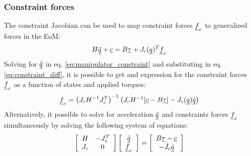 \subsubsection{Constraint forces}
\label{sec:constraint_forces}

The constraint Jacobian can be used to map constraint forces $\underline{f}_c$ to generalized forces in the EoM:
%
\begin{align}
H \underline{\ddot{q}} + \underline{c} = B \underline{\tau} + J_c( \underline{ q } )^T  \underline{f}_c
\label{eq:manipulator_constraint}
\end{align}
%
Solving for $\underline{\ddot{q}}$ in eq. \eqref{eq:manipulator_constraint} and substituting in eq. \eqref{eq:constraint_diff}, it is possible to get and expression for the constraint forces $\underline{f}_c$ as a function of states and applied torques:
%
\begin{align}
\underline{f}_c = \left( J_c H^{-1} J_c^T \right)^{-1} \left(  J_c H^{-1} [\underline{c} - B \underline{\tau} ] - \dot{J}_c( \underline{ q } ) \underline{\dot{q}}   \right)
\label{eq:const_forces}
\end{align}
%
Alternatively, it possible to solve for acceleration $\underline{\ddot{q}}$ and constraints forces $\underline{f}_c$ simultaneously by solving the following system of equations:
%
\begin{align}
\left[ \begin{array}{c c } 	H & -J_c^T  \\ J_c 	& 0  	\end{array} \right] \left[ \begin{array}{c} \underline{\ddot{q}}  \\ \underline{f}_c \end{array} \right] = \left[ \begin{array}{c}  B \underline{\tau} - \underline{c}   \\ -\dot{J}_c \underline{\dot{q}}  \end{array} \right]
\label{eq:manipulator_constraint_eom}
\end{align}


